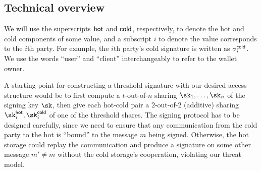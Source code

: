 \subsection{Technical overview}

We will use the superscripts $\mathsf{hot}$ and $\mathsf{cold}$, respectively, to denote the hot and cold components of some value, and a subscript $i$ to denote the value corresponds to the $i$th party. For example, the $i$th party's cold signature is written as $\sigma_i^{\mathsf{cold}}$. We use the words ``user'' and ``client'' interchangeably to refer to the wallet owner.

A starting point for constructing a threshold signature with our desired access structure would be to first compute a $t$-out-of-$n$ sharing $\sk_1, \dots, \sk_n$ of the signing key $\sk$, then give each hot-cold pair a $2$-out-of-$2$ (additive) sharing $\sk_i^\hot, \sk_i^\cold$ of one of the threshold shares. 
The signing protocol has to be designed carefully, since we need to ensure that any communication from the cold party to the hot is ``bound'' to the message $m$ being signed. Otherwise, the hot storage could replay the communication and produce a signature on some other message $m' \neq m$ without the cold storage's cooperation, violating our threat model.

